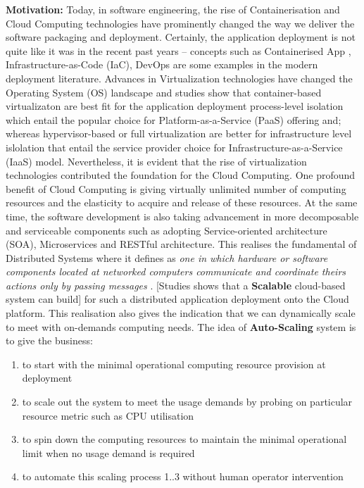\textbf{Motivation:} \quad Today, in software engineering, the rise of Containerisation \parencite{Scheepers2014VirtualizationAC} and Cloud Computing \parencite{Armbrust:2010:VCC:1721654.1721672} technologies have prominently changed the way we deliver the software packaging and deployment. Certainly, the application deployment is not quite like it was in the recent past years -- concepts such as Containerised App \parencite{Merkel:2014:DLL:2600239.2600241}, Infrastructure-as-Code (IaC), DevOps \parencite{httermann2012devops} are some examples in the modern deployment literature. Advances in Virtualization technologies have changed the Operating System (OS) landscape and studies \parencite{Kozhirbayev2017APC} \parencite{5708625} show that container-based virtualizaton are best fit for the application deployment process-level isolation which entail the popular choice for Platform-as-a-Service (PaaS) offering and; whereas hypervisor-based or full virtualization are better for infrastructure level islolation that entail the service provider choice for Infrastructure-as-a-Service (IaaS) model. Nevertheless, it is evident that the rise of virtualization technologies contributed the foundation for the Cloud Computing. One profound benefit of Cloud Computing is giving virtually unlimited number of computing resources and the elasticity to acquire and release of these resources. At the same time, the software development is also taking advancement in more decomposable and serviceable components such as adopting Service-oriented architecture (SOA), Microservices and RESTful architecture. This realises the fundamental of Distributed Systems where it defines as \textit{one in which hardware or software components located at networked computers communicate and coordinate theirs actions only by passing messages} \parencite{Coulouris:2011:DSC:2029110}. [Studies \parencite{Sinnott:2016:SCS:3008079.3008128} shows that a \textbf{Scalable} cloud-based system can build] for such a distributed application deployment onto the Cloud platform. This realisation also gives the indication that we can dynamically scale to meet with on-demands computing needs. The idea of \textbf{Auto-Scaling} system is to give the business:

\begin{enumerate}
\item to start with the minimal operational computing resource provision at deployment
\item to scale out the system to meet the usage demands by probing on particular resource metric such as CPU utilisation
\item to spin down the computing resources to maintain the minimal operational limit when no usage demand is required
\item to automate this scaling process 1..3 without human operator intervention
\end{enumerate}

